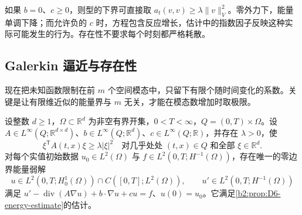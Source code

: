 如果 \(b=0\)、\(c\geq0\)，则型的下界可直接取 \(a_t(v,v)\geq\lambda\|v\|_V^2\)。零外力下，能量单调下降；而允许负的 \(c\) 时，方程包含反应增长，估计中的指数因子反映这种实际可能发生的行为。存在性不要求每个时刻都严格耗散。

\subsection{Galerkin 逼近与存在性}
\label{b2:subsec:D20604}

现在把未知函数限制在前 \(m\) 个空间模态中，只留下有限个随时间变化的系数。关键是让有限维近似的能量界与 \(m\) 无关，才能在模态数增加时取极限。

\begin{theorem}[一般线性抛物问题的能量可解性]\label{b2:thm:D6-parabolic-existence}
设整数 \(d\geq1\)，\(\Omega\subset\mathbb R^d\) 为非空有界开集，\(0<T<\infty\)，\(Q=(0,T)\times\Omega\)。设 \(A\in L^\infty(Q;\mathbb R^{d\times d})\)、\(b\in L^\infty(Q;\mathbb R^d)\)、\(c\in L^\infty(Q;\mathbb R)\)，并存在 \(\lambda>0\)，使
\[
 \xi^{\mathsf T}A(t,x)\xi\geq\lambda|\xi|^2
 \quad\text{对几乎处处 }(t,x)\in Q\text{ 和全部 }\xi\in\mathbb R^d.
\]
对每个实值初始数据 \(u_0\in L^2(\Omega)\) 与
\(f\in L^2(0,T;H^{-1}(\Omega))\)，存在唯一的零边界能量弱解
\[
 u\in L^2(0,T;H_0^1(\Omega))\cap C([0,T];L^2(\Omega)),
 \qquad u'\in L^2(0,T;H^{-1}(\Omega))
\]
满足 \(u'-\operatorname{div}(A\nabla u)+b\cdot\nabla u+cu=f\)、\(u(0)=u_0\)。它满足\cref{b2:prop:D6-energy-estimate}的估计。
\end{theorem}
